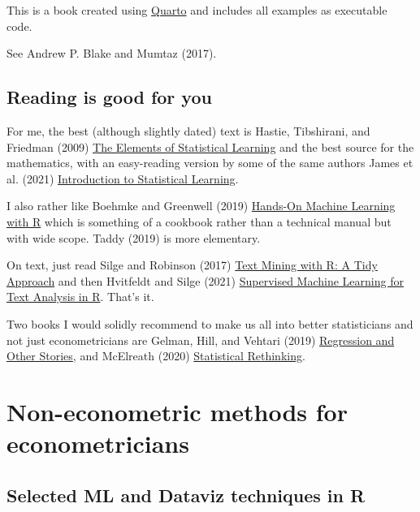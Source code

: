 \documentclass[
  letterpaper,
]{book}
\begin{document}
This is a book created using \href{quarto.org}{Quarto} and includes all
examples as executable code.

See Andrew P. Blake and Mumtaz (2017).

\hypertarget{reading-is-good-for-you}{%
\section{Reading is good for you}\label{reading-is-good-for-you}}

For me, the best (although slightly dated) text is Hastie, Tibshirani,
and Friedman (2009)
\href{https://web.stanford.edu/~hastie/ElemStatLearn/}{The Elements of
Statistical Learning} and the best source for the mathematics, with an
easy-reading version by some of the same authors James et al. (2021)
\href{https://www.statlearning.com/}{Introduction to Statistical
Learning}.

I also rather like Boehmke and Greenwell (2019)
\href{https://bradleyboehmke.github.io/HOML/}{Hands-On Machine Learning
with R} which is something of a cookbook rather than a technical manual
but with wide scope. Taddy (2019) is more elementary.

On text, just read Silge and Robinson (2017)
\href{https://www.tidytextmining.com/}{Text Mining with R: A Tidy
Approach} and then Hvitfeldt and Silge (2021)
\href{https://smltar.com/}{Supervised Machine Learning for Text Analysis
in R}. That's it.

Two books I would solidly recommend to make us all into better
statisticians and not just econometricians are Gelman, Hill, and Vehtari
(2019) \href{http://www.stat.columbia.edu/~gelman/regression}{Regression
and Other Stories}, and McElreath (2020)
\href{https://github.com/rmcelreath/rethinking}{Statistical Rethinking}.

\hypertarget{non-econometric-methods-for-econometricians}{%
\chapter{Non-econometric methods for
econometricians}\label{non-econometric-methods-for-econometricians}}

\hypertarget{selected-ml-and-dataviz-techniques-in-r}{%
\section{Selected ML and Dataviz techniques in
R}\label{selected-ml-and-dataviz-techniques-in-r}}
\end{document}
